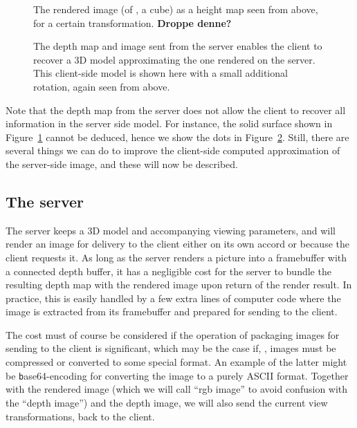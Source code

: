 \begin{figure}[htb]
  \centering
  
  \caption{\label{fig:2Dheightmap}
           The rendered image (of \eg, a cube) as a height map seen from above,
           for a certain transformation. \textbf{Droppe denne?}}
\end{figure}

\begin{figure}[htb]
  \centering
  \caption{\label{fig:2DheightmapRotated}
           The depth map and image sent from the server enables the client to
           recover a 3D model approximating the one rendered on the server. This
           client-side model is shown here with a small additional rotation, again
           seen from above.}
\end{figure}

Note that the depth map from the server does not allow the client to recover all
information in the server side model. For instance, the solid surface shown in
Figure~\ref{fig:2Dheightmap} cannot be deduced, hence we show the dots in
Figure~\ref{fig:2DheightmapRotated}. Still, there are several things we can do
to improve the client-side computed approximation of the server-side image, and
these will now be described.

\subsection{The server}

The server keeps a 3D model and accompanying viewing parameters, and will render
an image for delivery to the client either on its own accord or because the
client requests it. As long as the server renders a picture into a framebuffer
with a connected depth buffer, it has a negligible cost for the server to bundle
the resulting depth map with the rendered image upon return of the render
result. In practice, this is easily handled by a few extra lines of computer
code where the image is extracted from its framebuffer and prepared for sending
to the client.

The cost must of course be considered if the operation of packaging images for
sending to the client is significant, which may be the case if, \eg, images must
be compressed or converted to some special format. An example of the latter
might be {\texttt base64}-encoding for converting the image to a purely ASCII
format. Together with the rendered image (which we will call ``rgb image'' to
avoid confusion with the ``depth image'') and the depth image, we will also send
the current view transformations, back to the client.


